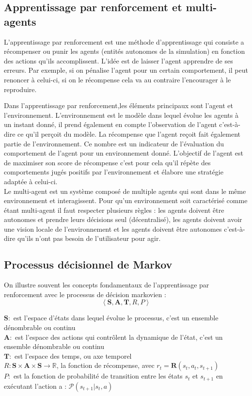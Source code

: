 \documentclass[11pt, a4paper]{article}
\begin{document}
	\subsection{Apprentissage par renforcement et multi-agents}
	L'apprentissage par renforcement est une méthode d'apprentissage qui consiste a récompenser ou punir les agents (entités autonomes de la simulation) en fonction des actions qu'ils accomplissent. L'idée est de laisser l'agent apprendre de ses erreurs. Par exemple, si on pénalise l'agent pour  un certain comportement, il peut renoncer à celui-ci, si on le récompense cela va au contraire l'encourager à le reproduire.

	Dans l'apprentissage par renforcement,les éléments principaux sont  l'agent et l'environnement. L'environnement est le modèle dans lequel évolue les agents à un instant donné, il prend également en compte l'observation de l'agent c'est-à-dire ce qu'il perçoit du modèle. La récompense que l'agent reçoit fait également partie de l'environnement. Ce nombre est un indicateur de l'évaluation du comportement de l'agent pour un environnement donné. L'objectif de l'agent est de maximiser son score de récompense c'est pour cela qu'il répète des comportements jugés positifs par l'environnement et élabore une stratégie adaptée à celui-ci.\\

	Le multi-agent est un système composé de multiple agents qui sont dans le même environnement et interagissent. Pour qu'un environnement soit caractérisé comme étant multi-agent il faut respecter plusieurs règles : les agents doivent être autonomes et prendre leurs décisions seul (décentralisé), les agents doivent avoir une vision locale de l'environnement et les agents doivent être autonomes c'est-à-dire qu'ils n'ont pas besoin de l'utilisateur pour agir.

	\subsection{Processus décisionnel de Markov}

	On illustre souvent les concepts fondamentaux de l'apprentissage par renforcement avec le processus de décision markovien :
	$$\left\langle \mathbf{S}, \mathbf{A}, \mathbf{T}, R, P\right\rangle$$

	\noindent$\mathbf{S} :$ est l’espace d’états dans lequel évolue le processus,  c'est un ensemble dénombrable ou continu \\
	$\mathbf{A} :$ est l’espace des actions qui contrôlent la dynamique de l’état, c'est un ensemble dénombrable ou continu  \\
	$\mathbf{T} :$ est l’espace des temps, ou axe temporel\\
	$R : \mathbf{S} \times \mathbf{A} \times \mathbf{S} \rightarrow \mathbb{R} $, la fonction de récompense, avec $r_t = \mathbf{R}\left(s_t, a_t, s_{t+1}\right)$  \\
	$P :$ est la fonction de probabilité de transition entre les états $s_t$ et $s_{t+1}$ en exécutant l'action a : $\mathcal{P} \left(s_{t+1}|s_t,a\right)$
\end{document}

